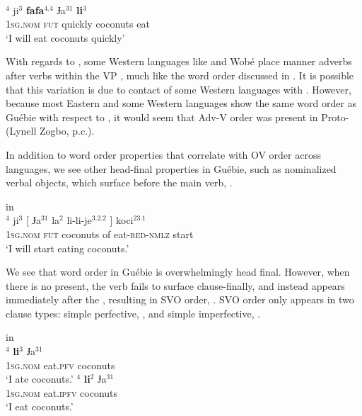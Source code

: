\documentclass[output=paper,newtxmath,modfonts,nonflat,draftmode]{langsci/langscibook}
\begin{document}
\\
$^{4}$ {ji}$^{3}$ \textbf{{fafa}$^{4.4}$} {Ɉa}$^{31}$ \textbf{{li}$^{3}$} \\
\textsc{1sg}.\textsc{nom} \textsc{fut} quickly  coconuts eat \\
\glt `I will eat coconuts quickly' \label{advv}
\z
\z

With regards to , some Western  languages like  and Wobé place manner adverbs after verbs within the VP \citep[80-81]{Marchese1979}, much like the  word order discussed in . It is possible that this variation is due to contact of some Western  languages with . However, because most Eastern and some Western  languages show the same word order as Guébie with respect to , it would seem that Adv-V order was present in Proto- (Lynell Zogbo, p.c.).

In addition to word order properties that correlate with OV order across languages, we see other head-final properties in Guébie, such as nominalized verbal objects, which surface before the main verb, .

 in \\ \label{ex:5:Guebie}
$^{4}$ {ji}$^{3}$ [ {Ɉa}$^{31}$ {la}$^{2}$ {li-li-je}$^{3.2.2}$ ] {koci}$^{23.1}$ \\
\textsc{1sg}.\textsc{nom} \textsc{fut} {} coconuts of eat-\textsc{red}-\textsc{nmlz} {} start \\
\glt `I will start eating coconuts.'
\z

We see that word order in Guébie is overwhelmingly head final. However, when there is no  present, the verb fails to surface clause-finally, and instead appears immediately after the , resulting in SVO order, . SVO order only appears in two clause types: simple perfective, ,  and simple imperfective, .

 in \\ \label{ex:6:Guebie}
\ea 
{}$^{4}$ \textbf{{li}$^{3}$}  {Ɉa}$^{31}$ \\
\textsc{1sg}.\textsc{nom} eat.\textsc{pfv} coconuts \\
\glt `I ate coconuts.' \label{ex:6a:Guebie}
\ex 
{}$^{4}$ \textbf{{li}$^{2}$}  {Ɉa}$^{31}$ \\
\textsc{1sg}.\textsc{nom} eat.\textsc{ipfv} coconuts \\
\glt `I eat coconuts.' \label{ex:6b:Guebie}
\z
\z
\end{document}

